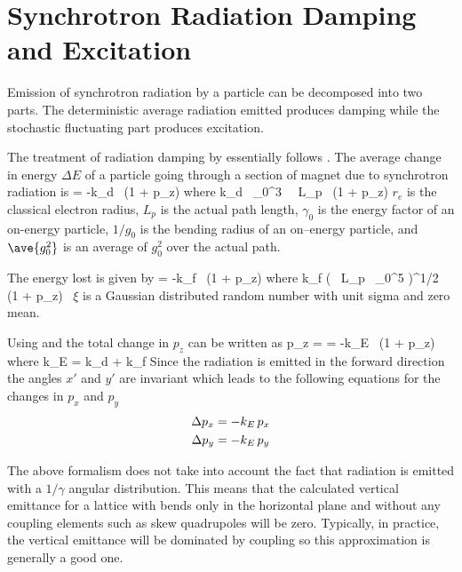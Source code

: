 \section{Synchrotron Radiation Damping and Excitation}
\label{s:radiation}

Emission of synchrotron radiation by a particle can be decomposed into
two parts. The deterministic average radiation emitted produces damping
while the stochastic fluctuating part produces excitation\cite{b:jowett}.

The treatment of radiation damping by \bmad essentially follows \mad.
The average change in energy $\Delta E$ of a particle going through a
section of magnet due to synchrotron radiation is
\Begineq
   = -k_d \, (1 + p_z)
\Endeq
where
\Begineq
  k_d \equiv {} \, \gamma_0^3 \,  \, L_p \,  
  (1 + p_z)
  \label{k2r3g}
\Endeq
$r_e$ is the classical electron radius, $L_p$ is the actual path
length, $\gamma_0$ is the energy factor of an on-energy particle, $1/g_0$
is the bending radius of an on--energy particle, and $\ave{g_0^2}$ is an
average of $g_0^2$ over the actual path.

The energy lost is given by
\Begineq
   = -k_f \, (1 + p_z)
\Endeq
where
\Begineq
  k_f \equiv \left(  \, 
  L_p \, \gamma_0^5  \right)^{1/2} \, (1 + p_z) \, \xi
  \label{k55rh}
\Endeq
$\xi$ is a Gaussian distributed random number with unit sigma and zero mean.

Using  and  the total change in $p_z$ can be written as
\Begineq
  \Delta p_z =  = -k_E \, (1 + p_z)
\Endeq
where
\Begineq
  k_E = k_d + k_f
\Endeq
Since the radiation is emitted in the forward direction the angles
$x'$ and $y'$ are invariant which leads to the following equations for
the changes in $p_x$ and $p_y$
\begin{align}
  \Delta p_x &= -k_E \, p_x \nonumber \\
  \Delta p_y &= -k_E \, p_y 
\end{align}

The above formalism does not take into account the fact that radiation is 
emitted with a $1/\gamma$ angular distribution. This means that the calculated
vertical emittance for a lattice with
bends only in the horizontal plane and without any coupling elements such as
skew quadrupoles will be zero. Typically, in practice, the vertical emittance
will be dominated by coupling so this approximation is generally a good one.

